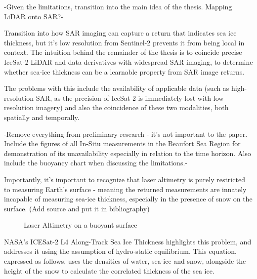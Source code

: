 -Given the limitations, transition into the main idea of the thesis. Mapping LiDAR onto SAR?- 

Transition into how SAR imaging can capture a return that indicates sea ice thickness, but it's low resolution from Sentinel-2 prevents it from being local in context. The intuition behind the remainder of the thesis is to coincide precise IceSat-2 LiDAR and data derivatives with widespread SAR imaging, to determine whether sea-ice thickness can be a learnable property from SAR image returns.

The problems with this include the availability of applicable data (such as high-resolution SAR, as the precision of IceSat-2 is immediately lost with low-resolution imagery) and also the coincidence of these two modalities, both spatially and temporally.

-Remove everything from preliminary research - it's not important to the paper. Include the figures of all In-Situ measurements in the Beaufort Sea Region for demonstration of its unavailability especially in relation to the time horizon. Also include the buoyancy chart when discussing the limitations.-
\par

Importantly, it's important to recognize that laser altimetry is purely restricted to measuring Earth's surface - meaning the returned measurements are innately incapable of measuring sea-ice thickness, especially in the presence of snow on the surface. (Add source and put it in bibliography)
\begin{figure}[htb]
	\centering
	\caption{Laser Altimetry on a buoyant surface} \cite{ICESat-2-L4-Product}
	\label{fig:hydro-static-diagram}
\end{figure}

NASA's ICESat-2 L4 Along-Track Sea Ice Thickness highlights this problem, and addresses it using the assumption of hydro-static equilibrium. This equation, expressed as follows, uses the densities of water, sea-ice and snow, alongside the height of the snow to calculate the correlated thickness of the sea ice.

